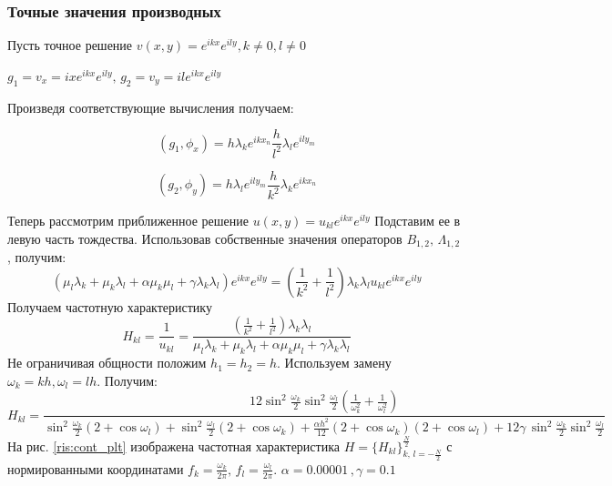 \documentclass{article}
\begin{document}
\subsubsection{Точные значения производных}
Пусть точное решение $v(x,y) = e^{ikx}e^{ily}, k \neq 0, l \neq 0$

$g_1 = v_x =ixe^{ikx}e^{ily},\, g_2 = v_y = ile^{ikx}e^{ily}$

Произведя соответствующие вычисления получаем:

$$(g_1, \phi_x) = h \lambda_k e^{ikx_n} \frac{h}{l^2} \lambda_l e^{ily_m}$$

$$(g_2, \phi_y) = h \lambda_l e^{ily_m} \frac{h}{k^2} \lambda_k e^{ikx_n}$$

Теперь рассмотрим приближенное решение $u(x,y) = u_{kl} e^{ikx}e^{ily}$
Подставим ее в левую часть тождества. Использовав собственные значения
операторов $B_{1,2} ,\,\Lambda_{1,2}$ , получим:
\begin{equation}
(\mu_l \lambda_k + \mu_k \lambda_l + \alpha \mu_k \mu_l + \gamma \lambda_k \lambda_l)e^{ikx}e^{ily} = (\frac{1}{k^2} + \frac{1}{l^2})\lambda_k\lambda_lu_{kl}e^{ikx}e^{ily}
\end{equation}
Получаем частотную характеристику
\begin{equation}
H_{kl} = \frac{1}{u_{kl}} = \frac{(\frac{1}{k^2} + \frac{1}{l^2})\lambda_k\lambda_l}{\mu_l \lambda_k + \mu_k \lambda_l + \alpha \mu_k \mu_l + \gamma \lambda_k \lambda_l}
\end{equation}
Не ограничивая общности положим $h_1 = h_2 = h$. Используем замену $\omega_k = kh, \omega_l = lh$. Получим:
\begin{equation}
H_{kl} = \frac{12 \sin^2\frac{\omega_k}{2}  \sin^2\frac{\omega_l}{2}(\frac{1}{\omega_k^2} + \frac{1}{\omega_l^2}) }
            { \sin^2\frac{\omega_k}{2}(2 +  \cos\omega_l) +  \sin^2\frac{\omega_l}{2}(2  +  \cos\omega_k) + \frac{\alpha h^2}{12}(2 +  \cos\omega_k)(2 +  \cos\omega_l) + 12\gamma \, \sin^2\frac{\omega_k}{2}  \sin^2\frac{\omega_l}{2}}
\end{equation}
На рис. \ref{ris:cont_plt} изображена частотная характеристика $H=\{H_{kl}\}^{\frac{N}{2}}_{k,\,l=-\frac{N}{2}}$ с нормированными координатами $f_k = \frac{\omega_k}{2\pi} ,\, f_l = \frac{\omega_l}{2\pi}$. $\alpha = 0.00001\,,\gamma = 0.1$
\end{document}
